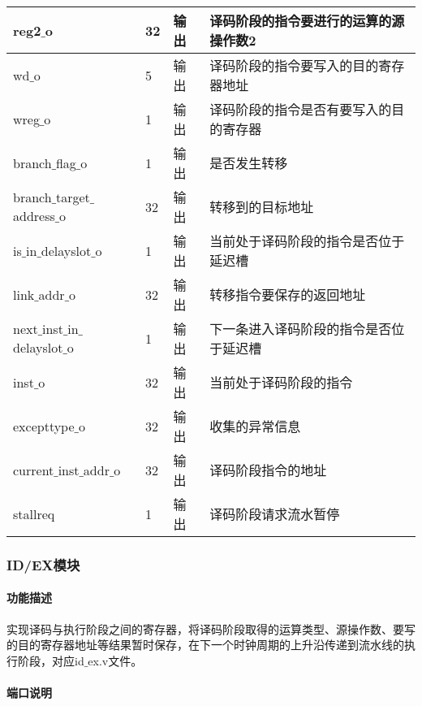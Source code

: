 \begin{table}[H]
\begin{tabular}{|l|l|l|l|}
		\hline
		reg2$\_$o & 32 & 输出 & 译码阶段的指令要进行的运算的源操作数2 \\
		\hline
		wd$\_$o & 5 & 输出 & 译码阶段的指令要写入的目的寄存器地址 \\
		\hline
		wreg$\_$o & 1 & 输出 & 译码阶段的指令是否有要写入的目的寄存器 \\
		\hline
		branch$\_$flag$\_$o & 1 & 输出 & 是否发生转移 \\
		\hline
		branch$\_$target$\_$address$\_$o & 32 & 输出 & 转移到的目标地址 \\
		\hline
		is$\_$in$\_$delayslot$\_$o & 1 & 输出 & 当前处于译码阶段的指令是否位于延迟槽 \\
		\hline
		link$\_$addr$\_$o & 32 & 输出 & 转移指令要保存的返回地址 \\
		\hline
		next$\_$inst$\_$in$\_$delayslot$\_$o & 1 & 输出 & 下一条进入译码阶段的指令是否位于延迟槽 \\
		\hline
		inst$\_$o & 32 & 输出 & 当前处于译码阶段的指令 \\
		\hline
		excepttype$\_$o & 32 & 输出 & 收集的异常信息 \\
		\hline
		current$\_$inst$\_$addr$\_$o & 32 & 输出 & 译码阶段指令的地址 \\
		\hline
		stallreq & 1 & 输出 & 译码阶段请求流水暂停 \\
		\hline
	\end{tabular}
\end{table}
\subsubsection{ID/EX模块}
\paragraph{功能描述}
\quad

\quad

实现译码与执行阶段之间的寄存器，将译码阶段取得的运算类型、源操作数、要写的目的寄存器地址等结果暂时保存，在下一个时钟周期的上升沿传递到流水线的执行阶段，对应id$\_$ex.v文件。
\paragraph{端口说明}
\quad

